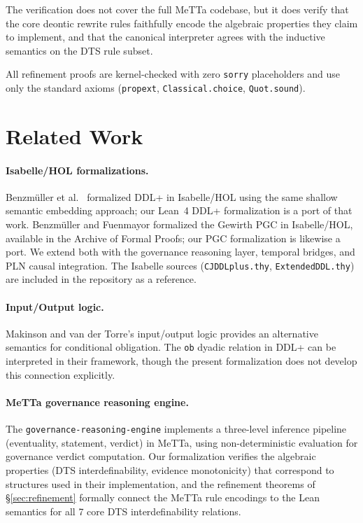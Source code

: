 \documentclass[]{article}
\newcommand{\code}[1]{\texttt{#1}}
\newcommand{\DDL}{\textup{DDL+}}
\newcommand{\DTS}{\textup{DTS}}
\newcommand{\PLN}{\textup{PLN}}
\newcommand{\PGC}{\textup{PGC}}
\begin{document}
\noindent
The verification does not cover the full MeTTa codebase, but it does
verify that the core deontic rewrite rules faithfully encode the
algebraic properties they claim to implement, and that the canonical
interpreter agrees with the inductive semantics on the DTS rule subset.

All refinement proofs are kernel-checked with zero \code{sorry} placeholders
and use only the standard axioms (\code{propext}, \code{Classical.choice},
\code{Quot.sound}).

\section{Related Work}
\label{sec:related}

\paragraph{Isabelle/HOL formalizations.}
Benzm{\"u}ller et al.\ \cite{Benzmuller2018} formalized \DDL{} in Isabelle/HOL
using the same shallow semantic embedding approach; our Lean~4 \DDL{} formalization
is a port of that work.
Benzm{\"u}ller and Fuenmayor \cite{Benzmuller2019PGC} formalized the Gewirth \PGC{}
in Isabelle/HOL, available in the Archive of Formal Proofs; our \PGC{}
formalization is likewise a port.
We extend both with the governance reasoning layer, temporal bridges,
and \PLN{} causal integration.
The Isabelle sources (\code{CJDDLplus.thy}, \code{ExtendedDDL.thy}) are
included in the repository as a reference.

\paragraph{Input/Output logic.}
Makinson and van der Torre's input/output logic \cite{MakinstonVanDerTorre2000}
provides an alternative semantics for conditional obligation.  The \code{ob}
dyadic relation in \DDL{} can be interpreted in their framework, though the
present formalization does not develop this connection explicitly.

\paragraph{MeTTa governance reasoning engine.}
The \code{governance-reasoning-engine} \cite{GovReasoningEngine} implements
a three-level inference pipeline (eventuality, statement, verdict) in MeTTa,
using non-deterministic evaluation for governance verdict computation.
Our formalization verifies the algebraic properties (\DTS{}
interdefinability, evidence monotonicity) that correspond to structures
used in their implementation, and the refinement theorems of
\S\ref{sec:refinement} formally connect the MeTTa rule encodings to the
Lean semantics for all 7 core \DTS{} interdefinability relations.
\end{document}
